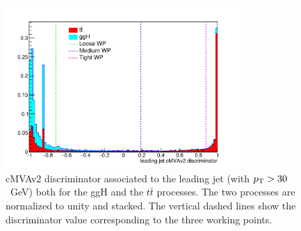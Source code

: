 \begin{figure}[!h]
\centering
\includegraphics[width=0.8\textwidth]{images/13TeV/cmva_WP.pdf}
\caption{cMVAv2 discriminator associated to the leading jet (with $p_\mathrm{T} > 30$~GeV) both for the ggH and the $t\bar t$ processes. The two processes are normalized to unity and stacked. The vertical dashed lines show the discriminator value corresponding to the three working points.}\label{fig:discriminator}
\end{figure}

